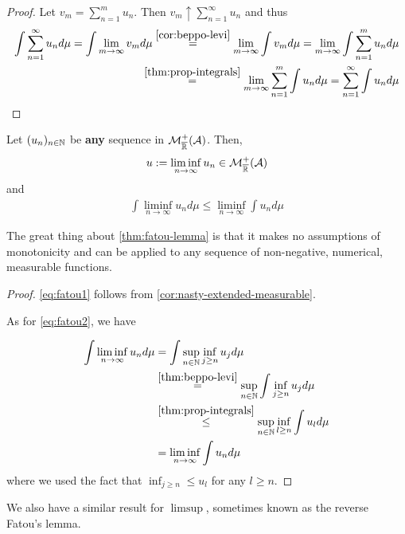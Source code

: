 \begin{proof}
	Let $v_m = \sum_{n=1}^{m} u_n$. Then $v_m \uparrow \sum_{n=1}^{\infty} u_n$ and thus
	\begin{align*}
		\int \sum_{n = 1}^\infty u_n d\mu
		= \int \lim_{m \to \infty} v_m d\mu
		\overset{\ref{cor:beppo-levi}}{=} \lim_{m \to \infty} \int v_m d\mu
		= \lim_{m \to \infty} \int \sum_{n = 1}^m u_n d\mu \\
		\overset{\ref{thm:prop-integrals}}{=} \lim_{m \to \infty} \sum_{n=1}^{m} \int u_n d\mu
		= \sum_{n = 1}^\infty \int u_n d\mu
	\end{align*}
\end{proof}

\begin{thm}
	\label{thm:fatou-lemma}
	Let $(u_n)_{n\in\mathbb{N}}$ be \textbf{any} sequence in $\mathcal{M}_{\overline{\mathbb{R}}}^+(\mathcal{A})$. Then,
	\begin{align}
		\label{eq:fatou1}
		u := \liminf_{n\to \infty} u_n \in \mathcal{M}_{\overline{\mathbb{R}}}^+(\mathcal{A})
	\end{align}
	and
	\begin{align}
		\label{eq:fatou2}
		\int \liminf_{n\to \infty} u_n d\mu \leq \liminf_{n\to \infty} \int u_n d\mu
	\end{align}
\end{thm}

The great thing about \autoref{thm:fatou-lemma} is that it makes no assumptions of monotonicity and can be applied to any sequence of non-negative, numerical, measurable functions.

\begin{proof}
	\autoref{eq:fatou1} follows from \autoref{cor:nasty-extended-measurable}.
	
	As for \autoref{eq:fatou2}, we have
	
	\begin{align*}
		\int \liminf_{n\to \infty} u_n d\mu
		&= \int \sup_{n\in\mathbb{N}} \inf_{j \geq n} u_j d\mu \\
		&\overset{\ref{thm:beppo-levi}}{=} \sup_{n\in\mathbb{N}} \int \inf_{j \geq n} u_j d\mu \\
		&\overset{\ref{thm:prop-integrals}}{\leq} \sup_{n\in\mathbb{N}} \inf_{l \geq n} \int u_l d\mu\\
		&= \liminf_{n\to\infty} \int u_n d\mu
	\end{align*}
	where we used the fact that $\inf_{j \geq n} \leq u_l$ for any $l \geq n$.
\end{proof}

We also have a similar result for $\limsup$, sometimes known as the reverse Fatou's lemma.

